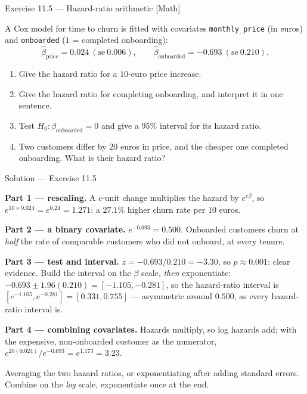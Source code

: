 \documentclass[aspectratio=169,11pt]{beamer}
\begin{document}
\begin{frame}{Exercise 11.5 --- Hazard-ratio arithmetic [Math]}
\begin{exercise}
  A Cox model for time to churn is fitted with covariates
  \texttt{monthly\_price} (in euros) and \texttt{onboarded} ($1$ = completed onboarding):
  \[
    \hat\beta_{\text{price}}=0.024\ (\mathrm{se}\ 0.006),
    \qquad
    \hat\beta_{\text{onboarded}}=-0.693\ (\mathrm{se}\ 0.210).
  \]
  \begin{enumerate}
    \item Give the hazard ratio for a $10$-euro price increase.
    \item Give the hazard ratio for completing onboarding, and interpret it in one
          sentence.
    \item Test $H_0:\beta_{\text{onboarded}}=0$ and give a $95\%$ interval for its
          hazard ratio.
    \item Two customers differ by $20$ euros in price, and the cheaper one completed
          onboarding. What is their hazard ratio?
  \end{enumerate}
\end{exercise}
\end{frame}

\begin{frame}{Solution --- Exercise 11.5}
\begin{solutionbox}
  \scriptsize
  \textbf{Part 1 --- rescaling.} A $c$-unit change multiplies the hazard by $e^{c\beta}$, so
  $e^{10\times 0.024}=e^{0.24}=1.271$: a $27.1\%$ higher churn rate per $10$ euros.

  \medskip
  \textbf{Part 2 --- a binary covariate.} $e^{-0.693}=0.500$. Onboarded customers churn at
  \emph{half} the rate of comparable customers who did not onboard, at every tenure.

  \medskip
  \textbf{Part 3 --- test and interval.} $z=-0.693/0.210=-3.30$, so $p\approx0.001$: clear
  evidence. Build the interval on the $\beta$ scale, \emph{then} exponentiate:
  $-0.693 \pm 1.96(0.210)=[-1.105,-0.281]$, so the hazard-ratio interval is
  $[e^{-1.105},e^{-0.281}]=[0.331,0.755]$ --- asymmetric around $0.500$, as every
  hazard-ratio interval is.

  \medskip
  \textbf{Part 4 --- combining covariates.} Hazards multiply, so log hazards add; with the
  expensive, non-onboarded customer as the numerator,
  $e^{20(0.024)}/e^{-0.693}=e^{1.173}=3.23$.
\end{solutionbox}
\begin{mistake}
  \scriptsize
  Averaging the two hazard ratios, or exponentiating after adding standard errors.
  Combine on the \emph{log} scale, exponentiate once at the end.
\end{mistake}
\end{frame}
\end{document}
